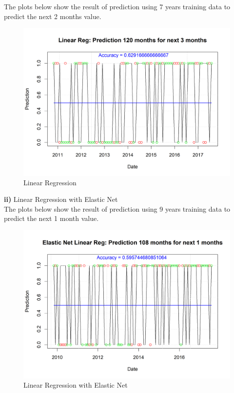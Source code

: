 \documentclass[12pt]{amsart}
\begin{document}
The plots below show the result of prediction using 7 years training data to predict the next 2 months value.
\begin{figure}[htb]
	\includegraphics[scale=0.75]{IYW_linear_reg_rolling}
	\caption{Linear Regression\label{overflow}}
\end{figure}

\newpage

\textbf{ii)} Linear Regression with Elastic Net\\

The plots below show the result of prediction using 9 years training data to predict the next 1 month value.
\begin{figure}[htb]
	\includegraphics[scale=0.75]{IYW_linear_elastic_rolling}
	\caption{Linear Regression with Elastic Net\label{overflow}}
\end{figure}
\end{document}
